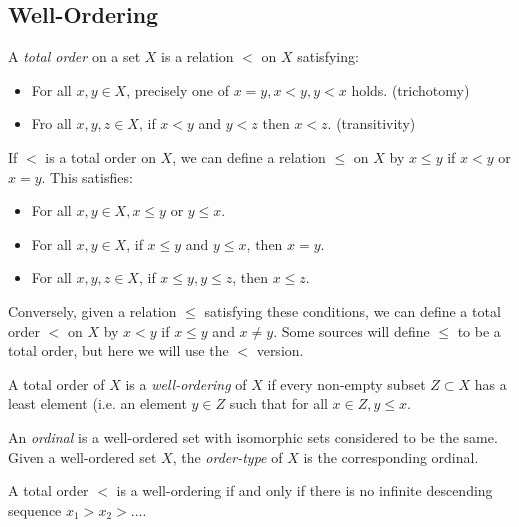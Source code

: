 \documentclass[10pt,a4paper]{article}
\begin{document}
\subsection{Well-Ordering}
A \emph{total order} on a set $X$ is a relation $<$ on $X$ satisfying:
\begin{itemize}
\item For all $x, y \in X$, precisely one of $x=y, x<y, y<x$ holds. \hfill(trichotomy)
\item Fro all $x,y,z \in X$, if $x<y$ and $y<z$ then $x<z$. \hfill(transitivity)
\end{itemize}
If $<$ is a total order on $X$, we can define a relation $\leq$ on $X$ by $x\leq y$ if $x<y$ or $x=y$. This satisfies:
\begin{itemize}
\item For all $x,y \in X, x\leq y$ or $y \leq x$.
\item For all $x,y \in X$, if $x\leq y$ and $y\leq x$, then $x=y$.
\item For all $x,y,z \in X$, if $x\leq y, y\leq z$, then $x \leq z$.
\end{itemize}
Conversely, given a relation $\leq$ satisfying these conditions, we can define a total order $<$ on $X$ by $x<y$ if $x\leq y$ and $x \neq y$. Some sources will define $\leq$ to be a total order, but here we will use the $<$ version.

A total order of $X$ is a \emph{well-ordering} of $X$ if every non-empty subset $Z \subset X$ has a least element (i.e. an element $y \in Z$ such that for all $x \in Z, y \leq x$.

An \emph{ordinal} is a well-ordered set with isomorphic sets considered to be the same. Given a well-ordered set $X$, the \emph{order-type} of $X$ is the corresponding ordinal.

A total order $<$ is a well-ordering if and only if there is no infinite descending sequence $x_1 > x_2 > \ldots$.
\end{document}
